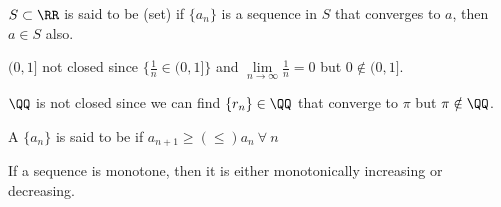\documentclass[12pt]{scrartcl}
\begin{document}
\begin{definition}
  $S \subset \RR$ is said to be  (set) if $\{a_n\}$ is a sequence in $S$ that converges to $a$, 
  then $a \in S$ also.
\end{definition}

\begin{example}
  $(0, 1]$ not closed since $\{\frac{1}{n} \in (0, 1]\}$ and $\underset{n\to\infty}{\lim}\frac{1}{n} = 0$ but $0 \notin (0, 1]$. 
\end{example}

\begin{example}
  $\QQ$ is not closed since we can find $\{r_n\} \in \QQ$ that converge to $\pi$ but $\pi \notin \QQ$.  
\end{example}

\begin{definition}
  A $\{a_n\}$ is said to be  if $a_{n+1} \geq (\leq) a_n \ \forall \ n$
\end{definition}

\begin{note}
  If a sequence is monotone, then it is either monotonically increasing or decreasing.
\end{note}
\end{document}
